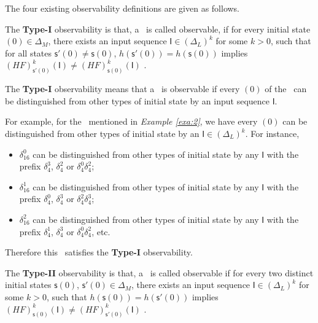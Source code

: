 The four existing observability definitions are given as follows.

\begin{definition} 
The {\bf Type-I} observability is that, a \BCN\ is called observable, if for every initial state \State$(0)$$\in \Delta_M$, there exists an input sequence $\mathsf{I}\in(\Delta_L)^k$ for some $k>0$, such that for all states $\mathsf{s}'(0)\neq \mathsf{s}(0)$, $h(\mathsf{s}'(0))=h(\mathsf{s}(0))$ implies $(HF)^k_{\mathsf{s}'(0)}(\mathsf{I})\neq (HF)^k_{{\mathsf{s}(0)}}(\mathsf{I})$ \cite{cheng2009controllability}.
\end{definition}

The  {\bf Type-I} observability means that a \BCN\ is observable if every \State$(0)$ of the \BCN\ can be distinguished from other types of initial state by an input sequence $\mathsf{I}$. %
\begin{example}
For example, for the \BCN\ mentioned in {\em Example \ref{exa:2}}, we have every \State$(0)$ can be distinguished from other types of initial state by an $\mathsf{I} \in(\Delta_L)^k$.  For instance,
\begin{itemize}
  \item $\delta_{16}^0$ can be distinguished from other types of initial state by any $\mathsf{I}$ with the prefix $\delta_{4}^3$, $\delta_{4}^2$ or $\delta_{4}^0  \delta_{4}^2$;
  \item $\delta_{16}^1$ can be distinguished from other types of initial state by any $\mathsf{I}$ with the prefix $\delta_{4}^0$, $\delta_{4}^3$ or $\delta_{4}^2 \delta_{4}^3$;
  \item $\delta_{16}^2$ can be distinguished from other types of initial state by any $\mathsf{I}$ with the prefix $\delta_{4}^1$, $\delta_{4}^3$ or $\delta_{4}^0 \delta_{4}^2$, etc.
\end{itemize} 
Therefore this \BCN\ satisfies the  {\bf Type-I} observability.
\label{exa:4}
\end{example}   

\begin{definition}
	The  {\bf Type-II} observability is that, a \BCN\ is called observable if for every two distinct initial states $\mathsf{s}(0)$, $\mathsf{s}'(0) \in \Delta_M$, there exists an input sequence $\mathsf{I}\in(\Delta_L)^k$ for some $k>0$, such that $h(\mathsf{s}(0))=h(\mathsf{s}'(0))$ implies $(HF)^k_{\mathsf{s}(0)}(\mathsf{I})\neq (HF)^k_{\mathsf{s}'(0)}(\mathsf{I})$ \cite{Zhao2010Input}.
\end{definition}

